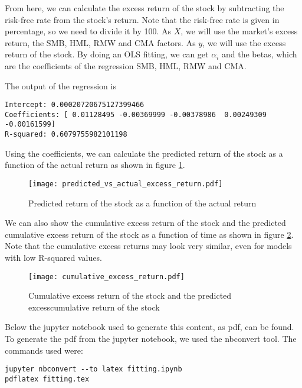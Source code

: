 \documentclass{article}
\begin{document}
From here, we can calculate the excess return of the stock by subtracting the risk-free rate from the stock's return.
Note that the risk-free rate is given in percentage, so we need to divide it by 100.
As $X$, we will use the market's excess return, the SMB, HML, RMW and CMA factors.
As $y$, we will use the excess return of the stock.
By doing an OLS fitting, we can get $\alpha_i$ and the betas,
which are the coefficients of the regression SMB, HML, RMW and CMA.

The output of the regression is
\footnotesize
\begin{verbatim}
Intercept: 0.00020720675127399466
Coefficients: [ 0.01128495 -0.00369999 -0.00378986  0.00249309 -0.00161599]
R-squared: 0.6079755982101198
\end{verbatim}
\normalsize

Using the coefficients, we can calculate the predicted return of the stock
as a function of the actual return as shown in
figure \ref{fig:predicted_return}.
\begin{figure}[ht]
    \centering
    \texttt{[image: predicted\_vs\_actual\_excess\_return.pdf]}
    \caption{Predicted return of the stock as a function of the actual return}
    \label{fig:predicted_return}
\end{figure}

We can also show the cumulative excess return of the stock and
the predicted cumulative excess return of the stock as a function of time as shown in
figure \ref{fig:cumulative_return}. Note that the cumulative excess returns
may look very similar, even for models with low R-squared values.

\begin{figure}[ht]
    \centering
    \texttt{[image: cumulative\_excess\_return.pdf]}
    \caption{Cumulative excess return of the stock and
        the predicted excesscumulative return of the stock}
    \label{fig:cumulative_return}
\end{figure}

Below the jupyter notebook used to generate this content, as pdf, can be found.
To generate the pdf from the jupyter notebook, we used the nbconvert tool.
The commands used were:
\begin{verbatim}
jupyter nbconvert --to latex fitting.ipynb
pdflatex fitting.tex
\end{verbatim}

\end{document}
